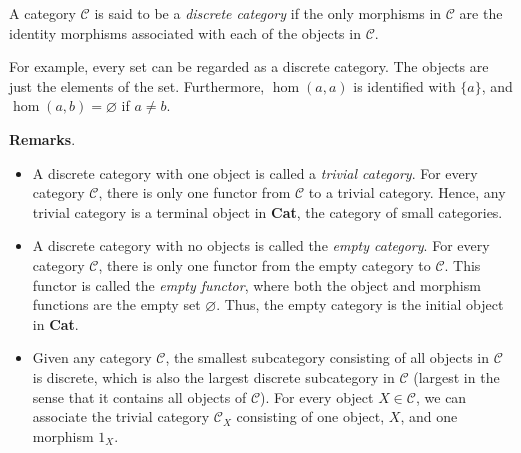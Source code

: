 \documentclass[12pt]{article}
\begin{document}
A category $\mathcal{C}$ is said to be a \emph{discrete category} if the only morphisms in $\mathcal{C}$ are the identity morphisms associated with each of the objects in $\mathcal{C}$.

For example, every set can be regarded as a discrete category.  The objects are just the elements of the set.  Furthermore, $\hom(a,a)$ is identified with $\lbrace a\rbrace$, and $\hom(a,b)=\varnothing$ if $a\ne b$.

\textbf{Remarks}.  
\begin{itemize}
\item
A discrete category with one object is called a \emph{trivial category}.  For every category $\mathcal{C}$, there is only one functor from $\mathcal{C}$ to a trivial category.  Hence, any trivial category is a terminal object in \textbf{Cat}, the category of small categories.
\item
A discrete category with no objects is called the \emph{empty category}.  For every category $\mathcal{C}$, there is only one functor from the empty category to $\mathcal{C}$.  This functor is called the \emph{empty functor}, where both the object and morphism functions are the empty set $\varnothing$.  Thus, the empty category is the initial object in \textbf{Cat}.
\item
Given any category $\mathcal{C}$, the smallest subcategory consisting of all objects in $\mathcal{C}$ is discrete, which is also the largest discrete subcategory in $\mathcal{C}$ (largest in the sense that it contains all objects of $\mathcal{C}$).  For every object $X\in \mathcal{C}$, we can associate the trivial category $\mathcal{C}_X$ consisting of one object, $X$, and one morphism $1_X$.
\end{itemize}
\end{document}

